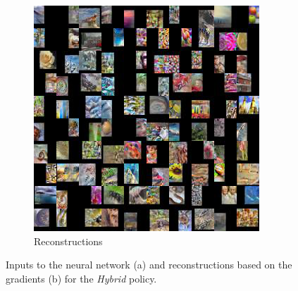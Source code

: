 \begin{figure}[hbt!]
\begin{subfigure}{.49\linewidth}
\includegraphics[width=\textwidth]{grids/data_cifar100_arch_ResNet20-4_epoch_200_optim_inversed_mode_aug_auglist_3-1-7+43-18-18_rlabel_False_reaugment_translate_clipped3_RECONSTRUCTIONS.png}
\caption{Reconstructions}%
\end{subfigure}%
\caption{Inputs to the neural network (a) and reconstructions based on the gradients (b) for the \textit{Hybrid} policy.}
    \label{fig:apprr}
\end{figure}

